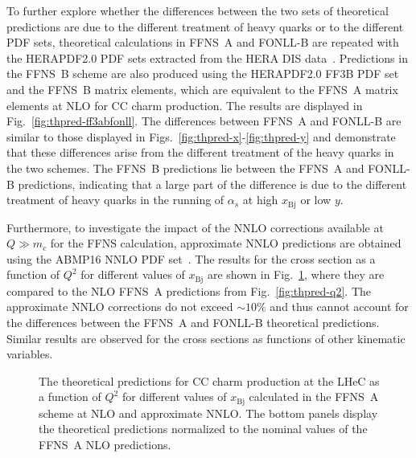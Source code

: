 \documentclass[pdftex,twocolumn,epjc3]{svjour3}          %
\newcommand{\abmp} {ABMP16\xspace}
\newcommand{\xbj}{\ensuremath{x_{\text{Bj}}}\xspace}
\newcommand{\fonll} {{FONLL-B}\xspace}
\newcommand{\ffns} {{FFNS~A}\xspace}
\newcommand{\ffnsb} {{FFNS~B}\xspace}
\newcommand{\ffthreeb} {{\hbox{HERAPDF2.0} FF3B}\xspace}
\begin{document}
To further explore whether the differences between the two sets of
theoretical predictions are due to the different treatment of heavy
quarks or to the different PDF sets, theoretical calculations in \ffns
and \fonll are repeated with the HERAPDF2.0 PDF sets extracted from
the HERA DIS data~\cite{Abramowicz:2015mha}.
%
Predictions in the \ffnsb scheme are also produced using the \ffthreeb
PDF set and the \ffnsb matrix elements, which are equivalent to the
\ffns matrix elements at NLO for CC charm production. The results are
displayed in Fig.~\ref{fig:thpred-ff3abfonll}. The differences between
\ffns and \fonll are similar to those displayed in
Figs.~\ref{fig:thpred-x}-\ref{fig:thpred-y} and demonstrate that these
differences arise from the different treatment of the heavy quarks in
the two schemes. The \ffnsb predictions lie between the \ffns and
\fonll predictions, indicating that a large part of the difference
is due to the different treatment of heavy quarks in the running of
$\alpha_s$ at high \xbj or low $y$.


Furthermore, to investigate the impact of the NNLO corrections
available at $Q \gg m_c$ for the FFNS calculation, approximate NNLO
predictions are obtained using the \abmp NNLO PDF
set~\cite{Alekhin:2017kpj}. The results for the cross section as a
function of $Q^2$ for different values of \xbj are shown in
Fig.~\ref{fig:thpred-q2-nnlo}, where they are compared to the NLO
\ffns predictions from Fig.~\ref{fig:thpred-q2}.
%
The approximate NNLO corrections
do not exceed $\sim 10\%$ and thus cannot account for the differences
between the \ffns and \fonll theoretical predictions.
%
Similar results
are observed for the cross sections as functions of other kinematic
variables.


\begin{figure}
  \centering
  \caption{The theoretical predictions
    for CC charm production at the LHeC as a function of $Q^2$ for
    different values of \xbj calculated in the \ffns scheme at NLO and
    approximate NNLO. The bottom panels display the theoretical
    predictions normalized to the nominal values of the \ffns NLO
    predictions.}
  \label{fig:thpred-q2-nnlo}
\end{figure}
\end{document}
